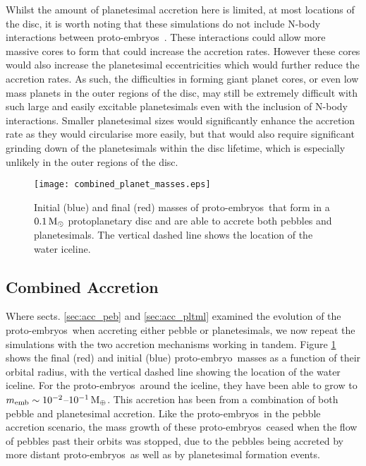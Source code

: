\documentclass[a4paper,fleqn,usenatbib]{mnras}
\newcommand{\me}{{\, {\rm M}_{\oplus}}}
\newcommand{\msun}{{\, {\rm M}_{\odot}}}
\newcommand{\emb}{{{proto-embryo~}}}
\newcommand{\embs}{{{proto-embryos~}}}
\begin{document}
Whilst the amount of planetesimal accretion here is limited, at most locations of the disc, it is worth noting that these simulations do not include N-body interactions between \embs.
These interactions could allow more massive cores to form that could increase the accretion rates.
However these cores would also increase the planetesimal eccentricities which would further reduce the accretion rates.
As such, the difficulties in forming giant planet cores, or even low mass planets in the outer regions of the disc, may still be extremely difficult with such large and easily excitable planetesimals even with the inclusion of N-body interactions.
Smaller planetesimal sizes would significantly enhance the accretion rate as they would circularise more easily, but that would also require significant grinding down of the planetesimals within the disc lifetime, which is especially unlikely in the outer regions of the disc.

\begin{figure}
\centering
\texttt{[image: combined\_planet\_masses.eps]}
\caption{Initial (blue) and final (red) masses of \embs that form in a $0.1 \msun$ protoplanetary disc and are able to accrete both pebbles and planetesimals. The vertical dashed line shows the location of the water iceline.}
\label{fig:combined_masses}
\end{figure}

\subsection{Combined Accretion}
\label{sec:acc_combined}

Where sects. \ref{sec:acc_peb} and \ref{sec:acc_pltml} examined the evolution of the \embs when accreting either pebble or planetesimals, we now repeat the simulations with the two accretion mechanisms working in tandem.
Figure \ref{fig:combined_masses} shows the final (red) and initial (blue) \emb masses as a function of their orbital radius, with the vertical dashed line showing the location of the water iceline.
For the \embs around the iceline, they have been able to grow to $m_{\rm emb}\sim 10^{-2}$--$10^{-1} \me$.
This accretion has been from a combination of both pebble and planetesimal accretion.
Like the \embs in the pebble accretion scenario, the mass growth of these \embs ceased when the flow of pebbles past their orbits was stopped, due to the pebbles being accreted by more distant \embs as well as by planetesimal formation events.
\end{document}
